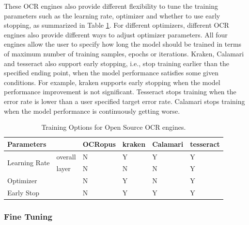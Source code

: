 \documentclass[conference]{IEEEtran}
\begin{document}
These OCR engines also provide different flexibility to tune the training
parameters such as the learning rate, optimizer and whether to use early
stopping, as summarized in Table \ref{tab:training_options}. For different
optimizers, different OCR engines also provide different ways to adjust
optimizer parameters. All four engines allow the user to specify how long the
model should be trained in terms of maximum number of training samples, epochs
or iterations. Kraken, Calamari and tesseract also support early stopping,
i.e., stop training earlier than the specified ending point, when the model
performance satisfies some given conditions. For example, kraken supports early
stopping when the model performance improvement is not significant. Tesseract
stops training when the error rate is lower than a user specified target error
rate. Calamari stops training when the model performance is continuously
getting worse.

\begin{table}[bt]
\begin{tabular}{llllll}
\hline
Parameters                     &         & OCRopus & kraken & Calamari & tesseract \\ \hline
\multirow{2}{*}{Learning Rate} & overall & N       & Y      & Y        & Y         \\
                               & layer   & N       & N      & N        & Y         \\
\hline
Optimizer                      &         & N       & Y      & N        & Y         \\ \hline
Early Stop                     &         & N       & Y      & Y        & Y         \\
\end{tabular}
\caption{Training Options for Open Source OCR engines.}
\label{tab:training_options}
\end{table}

\subsubsection*{Fine Tuning}
\end{document}
